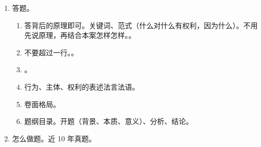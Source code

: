 \begin{enumerate}
\begin{enumerate}
          \item 占有。占有返还、停止侵害、排除妨害、消除危险、必要费用。
          \item 合同 \dy 无因管理 \dy 物权/占有 \dy 不当得利 \dy 侵权。
          \item 每个请求权都是分析 3 个问题。
                \begin{enumerate}
                  \item 内容 \yjt 请求权是什么。
                  \item 成立 \yjt 构成要件。。
                  \item 不成立 \yjt 抗辩事由。
                \end{enumerate}
        \end{enumerate}
  \item 答题。
        \begin{enumerate}
          \item 答背后的原理即可。关键词、范式（什么对什么有权利，因为什么）。不用先说原理，再结合本案怎样怎样。。
          \item 不要超过一行。。
          \item {}。
          \item 行为、主体、权利的表述法言法语。
          \item 卷面格局。
          \item 题纲目录。开题（背景、本质、意义）、分析、结论。
        \end{enumerate}
  \item 怎么做题。近 10 年真题。
\end{enumerate}
